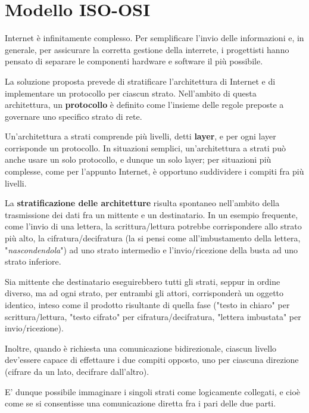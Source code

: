 \section{Modello ISO-OSI}
    Internet è infinitamente complesso. Per semplificare l'invio delle informazioni e, in generale, per assicurare la corretta gestione della interrete, i progettisti hanno pensato di separare le componenti hardware e software il più possibile.

    \vspace{3mm}
    
    La soluzione proposta prevede di stratificare l'architettura di Internet e di implementare un protocollo per ciascun strato. Nell'ambito di questa architettura, un \textbf{protocollo} è definito come l'insieme delle regole preposte a governare uno specifico strato di rete.
    
    \vspace{3mm}
    
    Un'architettura a strati comprende più livelli, detti \textbf{layer}, e per ogni layer corrisponde un protocollo. In situazioni semplici, un'architettura a strati può anche usare un solo protocollo, e dunque un solo layer; per situazioni più complesse, come per l'appunto Internet, è opportuno suddividere i compiti fra più livelli.
    
    La \textbf{stratificazione delle architetture} risulta spontaneo nell'ambito della trasmissione dei dati fra un mittente e un destinatario. In un esempio frequente, come l'invio di una lettera, la scrittura/lettura potrebbe corrispondere allo strato più alto, la cifratura/decifratura (la si pensi come all'imbustamento della lettera, "\textit{nascondendola}") ad uno strato intermedio e l'invio/ricezione della busta ad uno strato inferiore. 
    
    Sia mittente che destinatario eseguirebbero tutti gli strati, seppur in ordine diverso, ma ad ogni strato, per entrambi gli attori, corrisponderà un oggetto identico, inteso come il prodotto risultante di quella fase ("testo in chiaro" per scrittura/lettura, "testo cifrato" per cifratura/decifratura, "lettera imbustata" per invio/ricezione).
    
    Inoltre, quando è richiesta una comunicazione bidirezionale, ciascun livello dev'essere capace di effettaure i due compiti opposto, uno per ciascuna direzione (cifrare da un lato, decifrare dall'altro).
    
    E' dunque possibile immaginare i singoli strati come logicamente collegati, e cioè come se si consentisse una comunicazione diretta fra i pari delle due parti.
    
